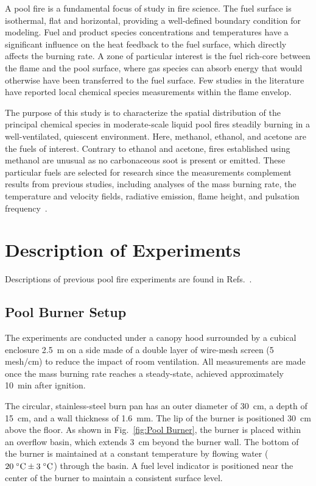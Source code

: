 \documentclass[12pt]{article}
\begin{document}
A pool fire is a fundamental focus of study in fire science. The fuel surface is isothermal, flat and horizontal, providing a well-defined boundary condition for modeling. Fuel and product species concentrations and temperatures have a significant influence on the heat feedback to the fuel surface, which directly affects the burning rate. A zone of particular interest is the fuel rich-core between the flame and the pool surface, where gas species can absorb energy that would otherwise have been transferred to the fuel surface. Few studies in the literature have reported local chemical species measurements within the flame envelop.

The purpose of this study is to characterize the spatial distribution of the principal chemical species in moderate-scale liquid pool fires steadily burning in a well-ventilated, quiescent environment. Here, methanol, ethanol, and acetone are the fuels of interest. Contrary to ethanol and acetone, fires established using methanol are unusual as no carbonaceous soot is present or emitted. These particular fuels are selected for research since the measurements complement results from previous studies, including analyses of the mass burning rate, the temperature and velocity fields, radiative emission, flame height, and pulsation frequency~\cite{Fisher1987,Hamins2016}.


\clearpage

\section{Description of Experiments}
\label{sec:Experiments}

Descriptions of previous pool fire experiments are found in Refs.~\cite{Hamins2016,Hamins1994,Hamins1991,Hamins1996,Lock2008}.

\subsection{Pool Burner Setup}
\label{ssec:Pool_Burner_Setup}

The experiments are conducted under a canopy hood surrounded by a cubical enclosure 2.5~m on a side made of a double layer of wire-mesh screen (5 mesh/cm) to reduce the impact of room ventilation. All measurements are made once the mass burning rate reaches a steady-state, achieved approximately 10~min after ignition.

The circular, stainless-steel burn pan has an outer diameter of 30~cm, a depth of 15~cm, and a wall thickness of 1.6~mm. The lip of the burner is positioned 30~cm above the floor. As shown in Fig.~\ref{fig:Pool Burner}, the burner is placed within an overflow basin, which extends 3~cm beyond the burner wall.  The bottom of the burner is maintained at a constant temperature by flowing water ($20 \; ^\circ \hbox{C} \pm 3 \; ^\circ \hbox{C}$)  through the basin. A fuel level indicator is positioned near the center of the burner to maintain a consistent surface level.
\end{document}
